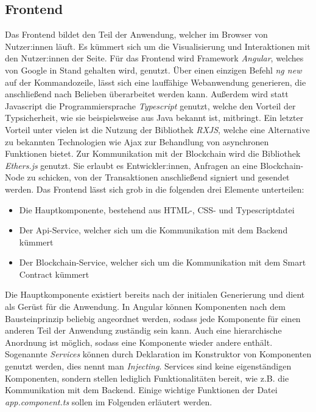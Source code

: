 \subsection{Frontend}
Das Frontend bildet den Teil der Anwendung, welcher im Browser von Nutzer:innen läuft. Es kümmert sich um die Visualisierung und Interaktionen mit den Nutzer:innen der Seite.
Für das Frontend wird Framework \emph{Angular}, welches von Google in Stand gehalten wird, genutzt. Über einen einzigen Befehl \emph{ng new} auf der Kommandozeile, lässt sich eine lauffähige Webanwendung generieren, die anschließend nach Belieben überarbeitet werden kann. Außerdem wird statt Javascript die Programmiersprache \emph{Typescript} genutzt, welche den Vorteil der Typsicherheit, wie sie beispielsweise aus Java bekannt ist, mitbringt. Ein letzter Vorteil unter vielen ist die Nutzung der Bibliothek \emph{RXJS}, welche eine Alternative zu bekannten Technologien wie Ajax zur Behandlung von asynchronen Funktionen bietet.
Zur Kommunikation mit der Blockchain wird die Bibliothek \emph{Ethers.js} genutzt. Sie erlaubt es Entwickler:innen, Anfragen an eine Blockchain-Node zu schicken, von der Transaktionen anschließend signiert und gesendet werden. Das Frontend lässt sich grob in die folgenden drei Elemente unterteilen:
\begin{itemize}
	\item Die Hauptkomponente, bestehend aus HTML-, CSS- und Typescriptdatei
	\item Der Api-Service, welcher sich um die Kommunikation mit dem Backend kümmert
	\item Der Blockchain-Service, welcher sich um die Kommunikation mit dem Smart Contract kümmert
\end{itemize}
Die Hauptkomponente existiert bereits nach der initialen Generierung und dient als Gerüst für die Anwendung. In Angular können Komponenten nach dem Bausteinprinzip beliebig angeordnet werden, sodass jede Komponente für einen anderen Teil der Anwendung zuständig sein kann. Auch eine hierarchische Anordnung ist möglich, sodass eine Komponente wieder andere enthält. Sogenannte \emph{Services} können durch Deklaration im Konstruktor von Komponenten genutzt werden, dies nennt man \emph{Injecting}. Services sind keine eigenständigen Komponenten, sondern stellen lediglich Funktionalitäten bereit, wie z.B. die Kommunikation mit dem Backend. Einige wichtige Funktionen der Datei \emph{app.component.ts} sollen im Folgenden erläutert werden.
